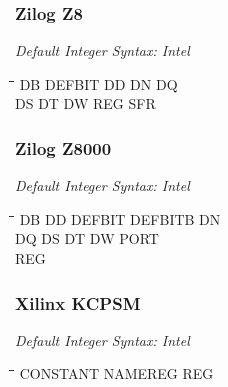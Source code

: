 \subsubsection{Zilog Z8}

{\em Default Integer Syntax: Intel}

{\tt\begin{tabbing}
\hspace{3cm}\=\hspace{3cm}\=\hspace{3cm}\=\hspace{3cm}\=\kill
DB         \> DEFBIT      \> DD          \> DN          \> DQ \\
DS         \> DT          \> DW          \> REG         \> SFR \\
\end{tabbing}}

\subsubsection{Zilog Z8000}

{\em Default Integer Syntax: Intel}

{\tt\begin{tabbing}
\hspace{3cm}\=\hspace{3cm}\=\hspace{3cm}\=\hspace{3cm}\=\kill
DB         \> DD          \> DEFBIT      \> DEFBITB    \> DN \\
DQ         \> DS          \> DT          \> DW         \> PORT \\
REG        \\
\end{tabbing}}

\subsubsection{Xilinx KCPSM}

{\em Default Integer Syntax: Intel}

{\tt\begin{tabbing}
\hspace{3cm}\=\hspace{3cm}\=\hspace{3cm}\=\hspace{3cm}\=\kill
CONSTANT   \> NAMEREG     \> REG \\
\end{tabbing}}


